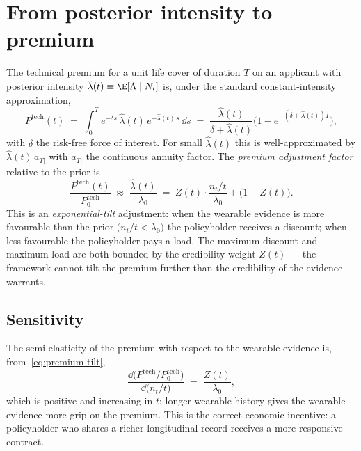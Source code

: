 \section{From posterior intensity to premium}\label{sec:premium}

The technical premium for a unit life cover of duration $T$ on an
applicant with posterior intensity
$\hat\lambda(t)\equiv\E[\Lambda\mid N_t]$ is, under the standard
constant-intensity approximation,
\begin{equation}\label{eq:premium-base}
   P^{\mathrm{tech}}(t) \;=\;
   \int_0^T e^{-\delta s}\,\hat\lambda(t)\,e^{-\hat\lambda(t)\,s}\,\dd s
   \;=\; \frac{\hat\lambda(t)}{\delta + \hat\lambda(t)}
        \bigl(1 - e^{-(\delta+\hat\lambda(t))T}\bigr),
\end{equation}
with $\delta$ the risk-free force of interest. For small
$\hat\lambda(t)$ this is well-approximated by
$\hat\lambda(t)\,\bar a_{T|}$ with $\bar a_{T|}$ the continuous
annuity factor. The \emph{premium adjustment factor} relative to the
prior is
\begin{equation}\label{eq:premium-tilt}
   \boxed{\;
   \frac{P^{\mathrm{tech}}(t)}{P^{\mathrm{tech}}_0}
   \;\approx\; \frac{\hat\lambda(t)}{\lambda_0}
   \;=\; Z(t)\cdot \frac{n_t/t}{\lambda_0} + \bigl(1-Z(t)\bigr).
   \;}
\end{equation}
This is an \emph{exponential-tilt} adjustment: when the wearable
evidence is more favourable than the prior $\bigl(n_t/t<\lambda_0\bigr)$
the policyholder receives a discount; when less favourable the
policyholder pays a load. The maximum discount and maximum load are
both bounded by the credibility weight $Z(t)$ --- the framework
cannot tilt the premium further than the credibility of the evidence
warrants.

\subsection{Sensitivity}\label{ss:sens}

The semi-elasticity of the premium with respect to the wearable
evidence is, from~\eqref{eq:premium-tilt},
\begin{equation}\label{eq:sens}
   \frac{\dd\bigl(P^{\mathrm{tech}}/P^{\mathrm{tech}}_0\bigr)}
        {\dd\bigl(n_t/t\bigr)}
   \;=\; \frac{Z(t)}{\lambda_0},
\end{equation}
which is positive and increasing in $t$: longer wearable history
gives the wearable evidence more grip on the premium. This is the
correct economic incentive: a policyholder who shares a richer
longitudinal record receives a more responsive contract.

